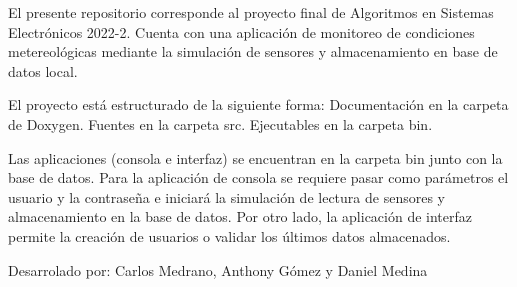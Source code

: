 El presente repositorio corresponde al proyecto final de Algoritmos en Sistemas Electrónicos 2022-\/2. Cuenta con una aplicación de monitoreo de condiciones metereológicas mediante la simulación de sensores y almacenamiento en base de datos local.

El proyecto está estructurado de la siguiente forma\+: Documentación en la carpeta de Doxygen. Fuentes en la carpeta src. Ejecutables en la carpeta bin.

Las aplicaciones (consola e interfaz) se encuentran en la carpeta bin junto con la base de datos. Para la aplicación de consola se requiere pasar como parámetros el usuario y la contraseña e iniciará la simulación de lectura de sensores y almacenamiento en la base de datos. Por otro lado, la aplicación de interfaz permite la creación de usuarios o validar los últimos datos almacenados.

Desarrolado por\+: Carlos Medrano, Anthony Gómez y Daniel Medina 